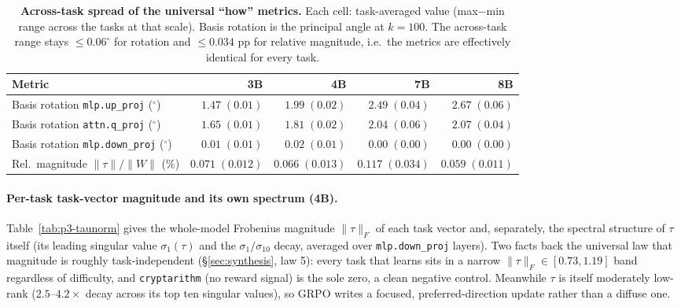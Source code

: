 \documentclass{article}
\newcommand{\tv}{\tau}
\newcommand{\dg}{^{\circ}}
\begin{document}
\begin{table}[h]
\centering\small
\caption{\textbf{Across-task spread of the universal ``how'' metrics.} Each cell: task-averaged value
(max$-$min range across the tasks at that scale). Basis rotation is the principal angle at $k{=}100$.
The across-task range stays $\leq0.06\dg$ for rotation and $\leq0.034$ pp for relative magnitude,
i.e.\ the metrics are effectively identical for every task.}
\label{tab:p3-spread}
\begin{tabular}{lrrrr}
\toprule
Metric & 3B & 4B & 7B & 8B\\
\midrule
Basis rotation \texttt{mlp.up\_proj} ($\dg$)   & $1.47\;(0.01)$ & $1.99\;(0.02)$ & $2.49\;(0.04)$ & $2.67\;(0.06)$\\
Basis rotation \texttt{attn.q\_proj} ($\dg$)   & $1.65\;(0.01)$ & $1.81\;(0.02)$ & $2.04\;(0.06)$ & $2.07\;(0.04)$\\
Basis rotation \texttt{mlp.down\_proj} ($\dg$) & $0.01\;(0.01)$ & $0.02\;(0.01)$ & $0.00\;(0.00)$ & $0.00\;(0.00)$\\
Rel.\ magnitude $\|\tau\|/\|W\|$ (\%)          & $0.071\;(0.012)$ & $0.066\;(0.013)$ & $0.117\;(0.034)$ & $0.059\;(0.011)$\\
\bottomrule
\end{tabular}
\end{table}

\paragraph{Per-task task-vector magnitude and its own spectrum (4B).} Table~\ref{tab:p3-taunorm}
gives the whole-model Frobenius magnitude $\|\tv\|_F$ of each task vector and, separately, the
spectral structure of $\tv$ itself (its leading singular value $\sigma_1(\tv)$ and the
$\sigma_1/\sigma_{10}$ decay, averaged over \texttt{mlp.down\_proj} layers). Two facts back the
universal law that magnitude is roughly task-independent (\S\ref{sec:synthesis}, law 5): every task
that learns sits in a narrow $\|\tv\|_F\in[0.73,1.19]$ band regardless of difficulty, and
\texttt{cryptarithm} (no reward signal) is the sole zero, a clean negative control. Meanwhile
$\tv$ is itself moderately low-rank ($2.5$--$4.2\times$ decay across its top ten singular values), so
GRPO writes a focused, preferred-direction update rather than a diffuse one.
\end{document}
